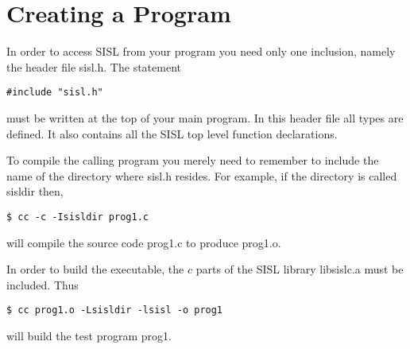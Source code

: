 \vfill
\newpage
\section{Creating a Program}

In order to access SISL from your program you need only one inclusion, namely
the header file sisl.h. The statement
\begin{verbatim}
#include "sisl.h"
\end{verbatim}
must be written at the top of your main program.
In this header file all types
are defined.
It also contains all the
SISL top level function declarations.


To compile the calling program you merely need to remember to include
the name of the directory where sisl.h resides.
For example, if the directory is called sisldir then,
\begin{verbatim}
$ cc -c -Isisldir prog1.c
\end{verbatim}
will compile the source code prog1.c to produce prog1.o.

In order to build the executable, the $c$ parts of the
SISL library libsislc.a must be included. Thus
\begin{verbatim}
$ cc prog1.o -Lsisldir -lsisl -o prog1
\end{verbatim}
will build the test program prog1. 

\newpage











